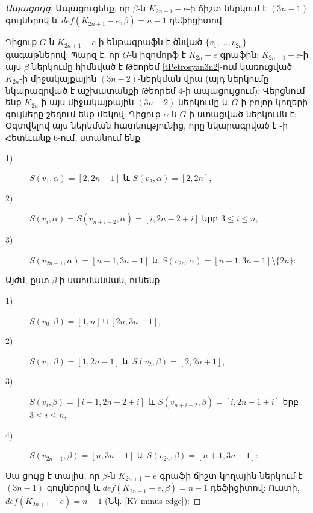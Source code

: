 \begin{hide}
\begin{proof}[Ապացույց]
Ապացուցենք, որ $\beta$-ն $K_{2n+1}-e$-ի ճիշտ ներկում է $(3n-1)$ գույներով և $def(K_{2n+1}-e,\beta)=n-1$ դեֆիցիտով:

Դիցուք $G$-ն $K_{2n+1}-e$-ի ենթագրաֆն է ծնված 
$\{v_{1},\ldots,v_{2n}\}$ գագաթներով: Պարզ է, որ $G$-ն իզոմորֆ է $K_{2n}-e$ գրաֆին:
$K_{2n+1}-e$-ի այս $\beta$ ներկումը հիմնված է Թեորեմ \ref{tPetrosyan3n2}-ում կառուցված $K_{2n}$-ի միջակայքային $(3n-2)$-ներկման վրա (այդ ներկումը նկարագրված է \cite{Petrosyan2010} աշխատանքի Թեորեմ 4-ի ապացույցում): %
Վերցնում ենք $K_{2n}$-ի այս միջակայքային $(3n-2)$-ներկումը և $G$-ի բոլոր կողերի գույները շեղում ենք մեկով: Դիցուք $\alpha$-ն $G$-ի ստացված ներկումն է: Օգտվելով այս ներկման հատկությունից, որը նկարագրված է \cite{Petrosyan2010}-ի Հետևանք 6-ում, ստանում ենք %

\begin{description}
\item[1)] $S\left(v_{1},\alpha\right)=[2,2n-1]$ և $S\left(v_{2},\alpha\right)=[2,2n]$,

\item[2)] $S\left(v_{i},\alpha\right)=S\left(v_{n+i-2},\alpha\right)=[i,2n-2+i]$ երբ $3\leq i\leq n$,

\item[3)]
$S\left(v_{2n-1},\alpha\right)=[n+1,3n-1]$ և
$S\left(v_{2n},\alpha\right)=[n+1,3n-1]\setminus\{2n\}$:
\end{description}

Այժմ, ըստ $\beta$-ի սահմանման, ունենք

\begin{description}
\item[1)] $S\left(v_{0},\beta\right)=[1,n]\cup [2n,3n-1]$,

\item[2)] $S\left(v_{1},\beta\right)=[1,2n-1]$ և $S\left(v_{2},\beta\right)=[2,2n+1]$,

\item[3)] $S\left(v_{i},\beta\right)=[i-1,2n-2+i]$ և $S\left(v_{n+i-2},\beta\right)=[i,2n-1+i]$ երբ $3\leq i\leq n$,

\item[4)]
$S\left(v_{2n-1},\beta\right)=[n,3n-1]$ և
$S\left(v_{2n},\beta\right)=[n+1,3n-1]$:
\end{description}

Սա ցույց է տալիս, որ $\beta$-ն $K_{2n+1}-e$ գրաֆի ճիշտ կողային ներկում է $(3n-1)$ գույներով և $def(K_{2n+1}-e,\beta)=n-1$ դեֆիցիտով: Ուստի,
$def(K_{2n+1}-e)=n-1$ (Նկ. \ref{K7-minus-edge}):
\end{proof}


\end{hide}

